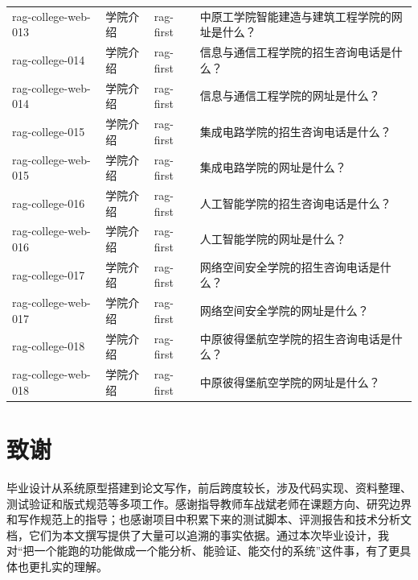 \documentclass[UTF8,zihao=-4,oneside]{ctexbook}
\numberwithin{equation}{chapter}
\begin{document}
{\begin{longtable}{p{}p{}p{}p{}}
  rag-college-web-013 & 学院介绍 & rag-first & 中原工学院智能建造与建筑工程学院的网址是什么？ \\
  rag-college-014 & 学院介绍 & rag-first & 信息与通信工程学院的招生咨询电话是什么？ \\
  rag-college-web-014 & 学院介绍 & rag-first & 信息与通信工程学院的网址是什么？ \\
  rag-college-015 & 学院介绍 & rag-first & 集成电路学院的招生咨询电话是什么？ \\
  rag-college-web-015 & 学院介绍 & rag-first & 集成电路学院的网址是什么？ \\
  rag-college-016 & 学院介绍 & rag-first & 人工智能学院的招生咨询电话是什么？ \\
  rag-college-web-016 & 学院介绍 & rag-first & 人工智能学院的网址是什么？ \\
  rag-college-017 & 学院介绍 & rag-first & 网络空间安全学院的招生咨询电话是什么？ \\
  rag-college-web-017 & 学院介绍 & rag-first & 网络空间安全学院的网址是什么？ \\
  rag-college-018 & 学院介绍 & rag-first & 中原彼得堡航空学院的招生咨询电话是什么？ \\
  rag-college-web-018 & 学院介绍 & rag-first & 中原彼得堡航空学院的网址是什么？ \\
  \bottomrule
\end{longtable}
}

\clearpage
\chapter*{致谢}
毕业设计从系统原型搭建到论文写作，前后跨度较长，涉及代码实现、资料整理、测试验证和版式规范等多项工作。感谢指导教师车战斌老师在课题方向、研究边界和写作规范上的指导；也感谢项目中积累下来的测试脚本、评测报告和技术分析文档，它们为本文撰写提供了大量可以追溯的事实依据。通过本次毕业设计，我对“把一个能跑的功能做成一个能分析、能验证、能交付的系统”这件事，有了更具体也更扎实的理解。
\end{document}
